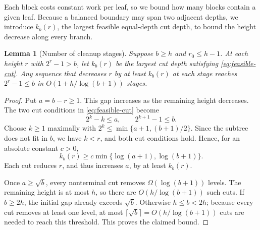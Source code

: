 \documentclass[11pt]{article}
\newtheorem{lemma}[lemma]{Lemma}
\theoremstyle{definition}
\theoremstyle{remark}
\begin{document}
Each block costs constant work per leaf, so we bound how many blocks contain a given leaf. Because a balanced boundary may span two adjacent depths, we introduce $k_b(r)$, the largest feasible equal-depth cut depth, to bound the height decrease along every branch.

\begin{lemma}[Number of cleanup stages]
\label{lem:slack}
Suppose $b\ge h$ and $r_0\le h-1$. At each height $r$ with $2^r-1>b$, let $k_b(r)$ be the largest cut depth satisfying \cref{eq:feasible-cut}. Any sequence that decreases $r$ by at least $k_b(r)$ at each stage reaches $2^r-1\le b$ in $O(1+h/\log(b+1))$ stages.
\end{lemma}
\begin{proof}
Put $a=b-r\ge1$. This gap increases as the remaining height decreases. The two cut conditions in \cref{eq:feasible-cut} become
\[
2^k-k\le a,\qquad 2^{k+1}-1\le b.
\]
Choose $k\ge1$ maximally with $2^k\le\min\{a+1,(b+1)/2\}$. Since the subtree does not fit in $b$, we have $k<r$, and both cut conditions hold. Hence, for an absolute constant $c>0$,
\[
 k_b(r)\ge c\min\{\log(a+1),\log(b+1)\}.
\]
Each cut reduces $r$, and thus increases $a$, by at least $k_b(r)$.

Once $a\ge\sqrt b$, every nonterminal cut removes $\Omega(\log(b+1))$ levels. The remaining height is at most $h$, so there are $O(h/\log(b+1))$ such cuts. If $b\ge2h$, the initial gap already exceeds $\sqrt b$. Otherwise $h\le b<2h$; because every cut removes at least one level, at most $\lceil\sqrt b\rceil=O(h/\log(b+1))$ cuts are needed to reach this threshold. This proves the claimed bound.
\end{proof}
\end{document}
